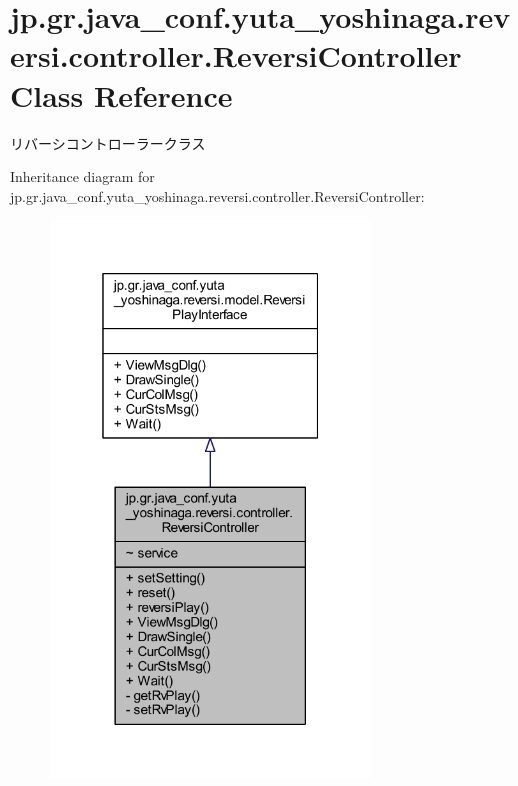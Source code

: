 \hypertarget{classjp_1_1gr_1_1java__conf_1_1yuta__yoshinaga_1_1reversi_1_1controller_1_1_reversi_controller}{}\section{jp.\+gr.\+java\+\_\+conf.\+yuta\+\_\+yoshinaga.\+reversi.\+controller.\+Reversi\+Controller Class Reference}
\label{classjp_1_1gr_1_1java__conf_1_1yuta__yoshinaga_1_1reversi_1_1controller_1_1_reversi_controller}


リバーシコントローラークラス  




Inheritance diagram for jp.\+gr.\+java\+\_\+conf.\+yuta\+\_\+yoshinaga.\+reversi.\+controller.\+Reversi\+Controller\+:
\nopagebreak
\begin{figure}[H]
\begin{center}
\leavevmode
\includegraphics[width=241pt]{classjp_1_1gr_1_1java__conf_1_1yuta__yoshinaga_1_1reversi_1_1controller_1_1_reversi_controller__inherit__graph}
\end{center}
\end{figure}


